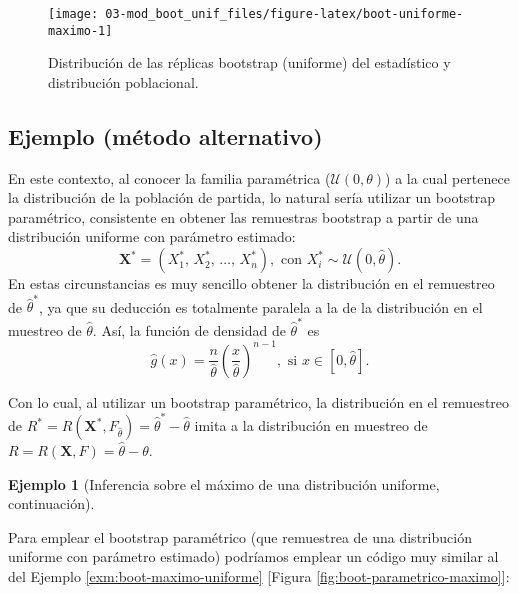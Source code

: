 \documentclass[
]{book}
\theoremstyle{break}
\theoremstyle{definition}
\theoremstyle{definition}
\newtheorem{example}{Ejemplo}[chapter]
\theoremstyle{definition}
\theoremstyle{definition}
\theoremstyle{remark}
\begin{document}
\begin{figure}[!htb]

{\centering \texttt{[image: 03-mod\_boot\_unif\_files/figure-latex/boot-uniforme-maximo-1]} 

}

\caption{Distribución de las réplicas bootstrap (uniforme) del estadístico y distribución poblacional.}\label{fig:boot-uniforme-maximo}
\end{figure}

\hypertarget{ejemplo-muxe9todo-alternativo}{%
\subsection{Ejemplo (método alternativo)}\label{ejemplo-muxe9todo-alternativo}}

En este contexto, al conocer la familia paramétrica (\(\mathcal{U}\left( 0,\theta \right)\)) a la cual pertenece la distribución de la población de
partida, lo natural sería utilizar un bootstrap paramétrico, consistente
en obtener las remuestras bootstrap a partir de una distribución
uniforme con parámetro estimado:
\[\mathbf{X}^{\ast}=\left( X_1^{\ast}\text{, }X_2^{\ast}\text{, 
}\ldots \text{, }X_n^{\ast} \right), \text{ con } X_i^{\ast} \sim \mathcal{U}\left( 0,\hat{\theta}\right).\]
En estas circunstancias es muy sencillo obtener la distribución en el
remuestreo de \(\hat{\theta}^{\ast}\), ya que su deducción es totalmente
paralela a la de la distribución en el muestreo de \(\hat{\theta}\). Así,
la función de densidad de \(\hat{\theta}^{\ast}\) es
\[\hat{g}\left( x \right) =\frac{n}{\hat{\theta}}\left( \frac{x}{\hat{\theta}}
 \right)^{n-1},\text{ si }x\in \left[ 0,\hat{\theta}\right] .\]

Con lo cual, al utilizar un bootstrap paramétrico, la distribución en el
remuestreo de \(R^{\ast}=R\left( \mathbf{X}^{\ast},F_{\hat{ \theta}} \right) =\hat{\theta}^{\ast}-\hat{\theta}\) imita a la
distribución en muestreo de
\(R=R\left( \mathbf{X},F \right) =\hat{\theta}-\theta\).

\begin{example}[Inferencia sobre el máximo de una distribución uniforme, continuación]
\protect\hypertarget{exm:boot-maximo-parametrico}{}{\label{exm:boot-maximo-parametrico} \iffalse (Inferencia sobre el máximo de una distribución uniforme, continuación) \fi{} }
\end{example}

Para emplear el bootstrap paramétrico (que remuestrea de una distribución
uniforme con parámetro estimado) podríamos emplear un código muy similar al
del Ejemplo \ref{exm:boot-maximo-uniforme} {[}Figura \ref{fig:boot-parametrico-maximo}{]}:
\end{document}
